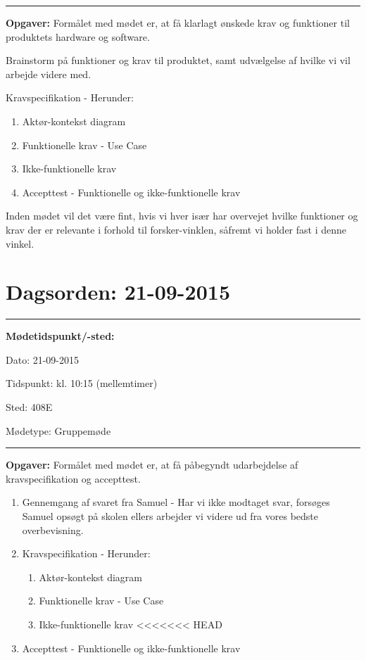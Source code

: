 \hrule
\textbf{Opgaver:} \newline
Formålet med mødet er, at få klarlagt ønskede krav og funktioner til produktets hardware og software.

Brainstorm på funktioner og krav til produktet, samt udvælgelse af hvilke vi vil arbejde videre med.


Kravspecifikation - Herunder:
\begin{enumerate}
\item Aktør-kontekst diagram
\item Funktionelle krav - Use Case
\item Ikke-funktionelle krav
\item Accepttest - Funktionelle og ikke-funktionelle krav
\end{enumerate}

Inden mødet vil det være fint, hvis vi hver især har overvejet hvilke funktioner og krav der er relevante i forhold til forsker-vinklen, såfremt vi holder fast i denne vinkel.

\newpage
\section{Dagsorden: 21-09-2015}
\hrule



\textbf{Mødetidspunkt/-sted:} 

Dato: \tabto{7em} 21-09-2015

Tidspunkt: \tabto{7em} kl. 10:15 (mellemtimer)

Sted: \tabto{7em} 408E

Mødetype: \tabto{7em} Gruppemøde \newline


\hrule
\textbf{Opgaver:} \newline
Formålet med mødet er, at få påbegyndt udarbejdelse af kravspecifikation og accepttest.
\begin{enumerate}
\item Gennemgang af svaret fra Samuel - Har vi ikke modtaget svar, forsøges Samuel opsøgt på skolen ellers arbejder vi videre ud fra vores bedste overbevisning.

\item Kravspecifikation - Herunder:

\begin{enumerate}
\item Aktør-kontekst diagram
\item Funktionelle krav - Use Case
\item Ikke-funktionelle krav
<<<<<<< HEAD
\end{enumerate}
\item Accepttest - Funktionelle og ikke-funktionelle krav
\end{enumerate}


